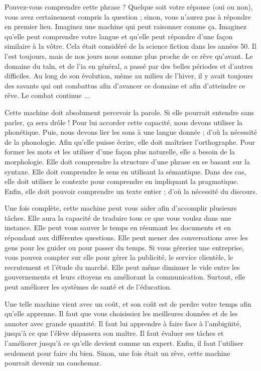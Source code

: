 \documentclass{KodeBook}
\begin{document}
\begin{discussion}

Pouvez-vous comprendre cette phrase ? 
Quelque soit votre réponse (oui ou non), vous avez certainement compris la question ; sinon, vous n'aurez pas à répondre en premier lieu. 
Imaginez une machine qui peut raisonner comme ça. 
Imaginez qu'elle peut comprendre votre langue et qu'elle peut répondre d'une façon similaire à la vôtre. 
Cela était considéré de la science fiction dans les années 50.
Il l'est toujours, mais de nos jours nous somme plus proche de ce rêve qu'avant. 
Le domaine du \ac{taln}, et de l'\ac{ia} en général, a passé par des belles périodes et d'autres difficiles. 
Au long de son évolution, même au milieu de l'hiver, il y avait toujours des savants qui ont combattus afin d'avancer ce domaine et afin d'atteindre ce rêve. 
Le combat continue ...

Cette machine doit absolument percevoir la parole.
Si elle pourrait entendre sans parler, ça sera drôle !
Pour lui accorder cette capacité, nous devons utiliser la phonétique. 
Puis, nous devons lier les sons à une langue donnée ; d'où la nécessité de la phonologie.
Afin qu'elle puisse écrire, elle doit maîtriser l'orthographe.
Pour former les mots et les utiliser d'une façon plus naturelle, elle a besoin de la morphologie.
Elle doit comprendre la structure d'une phrase en se basant sur la syntaxe. 
Elle doit comprendre le sens en utilisant la sémantique.
Dans des cas, elle doit utiliser le contexte pour comprendre en impliquant la pragmatique. 
Enfin, elle doit pouvoir comprendre un texte entier ; d'où la nécessité du discours.

Une fois complète, cette machine peut vous aider afin d'accomplir plusieurs tâches. 
Elle aura la capacité de traduire tous ce que vous voulez dans une instance.
Elle peut vous sauver le temps en résumant les documents et en répondant aux différentes questions.
Elle peut mener des conversations avec les gens pour les guider ou pour passer du temps.
Si vous géreriez une entreprise, vous pouvez compter sur elle pour gérer la publicité, le service clientèle, le recrutement et l'étude du marché. 
Elle peut même diminuer le vide entre les gouvernements et leurs citoyens en améliorant la communication. 
Surtout, elle peut améliorer les systèmes de santé et de l'éducation.

Une telle machine vient avec un coût, et son coût est de perdre votre temps afin qu'elle apprenne. 
Il faut que vous choisissiez les meilleures données et de les annoter avec grande quantité. 
Il faut lui apprendre à faire face à l'ambigüité, jusqu'à ce que l'élève dépassera son maître.
Il faut évaluer ses tâches et l'améliorer jusqu'à ce qu'elle devient comme un expert. 
Enfin, il faut l'utiliser seulement pour faire du bien. 
Sinon, une fois était un rêve, cette machine pourrait devenir un cauchemar.

\end{discussion}

\ifx\wholebook\relax\else
% 
% 
	
\end{document}
